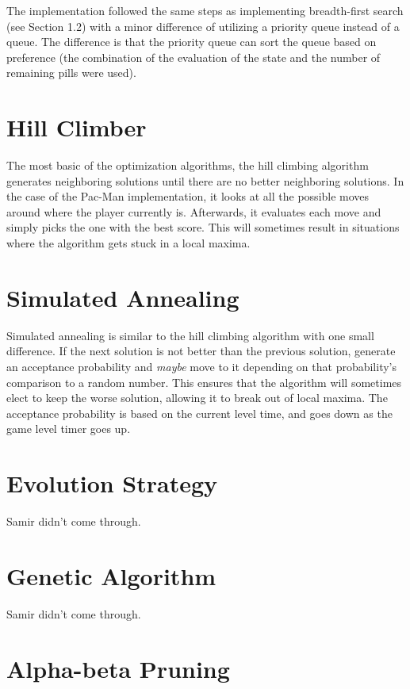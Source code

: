 \documentclass[a4paper,oneside,10pt]{report}
\begin{document}
The implementation followed the same steps as implementing breadth-first search (see Section 1.2) with a minor difference of utilizing a priority queue instead of a queue. The difference is that the priority queue can sort the queue based on preference (the combination of the evaluation of the state and the number of remaining pills were used). 

\section{Hill Climber}\label{hill}

The most basic of the optimization algorithms, the hill climbing algorithm generates neighboring solutions until there are no better neighboring solutions. In the case of the Pac-Man implementation, it looks at all the possible moves around where the player currently is. Afterwards, it evaluates each move and simply picks the one with the best score. This will sometimes result in situations where the algorithm gets stuck in a local maxima.

\section{Simulated Annealing}\label{sannealing}

Simulated annealing is similar to the hill climbing algorithm with one small difference. If the next solution is not better than the previous solution, generate an acceptance probability and \textit{maybe} move to it depending on that probability's comparison to a random number. This ensures that the algorithm will sometimes elect to keep the worse solution, allowing it to break out of local maxima. The acceptance probability is based on the current level time, and goes down as the game level timer goes up. 

\section{Evolution Strategy}\label{evolution}

Samir didn't come through.

\section{Genetic Algorithm}\label{genetic}

Samir didn't come through.

\section{Alpha-beta Pruning}\label{alphabeta}
\end{document}
